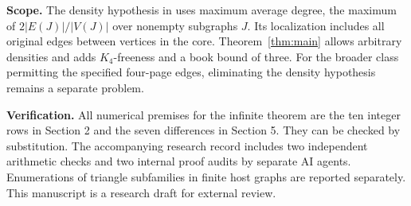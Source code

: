 \documentclass[11pt,a4paper]{article}
\newcommand{\smalltitle}[1]{\par\medskip\noindent\textbf{#1}\enspace}
\begin{document}
\smalltitle{Scope.}
The density hypothesis in \cite{tsu} uses maximum average degree, the
maximum of \(2|E(J)|/|V(J)|\) over nonempty subgraphs \(J\). Its localization
includes all original edges between vertices in the core. Theorem~\ref{thm:main}
allows arbitrary densities and adds \(K_4\)-freeness and a book bound of three.
For the broader class permitting the specified four-page edges, eliminating
the density hypothesis remains a separate problem.

\smalltitle{Verification.}
All numerical premises for the infinite theorem are the ten integer rows
in Section 2 and the seven differences in Section 5. They can be checked by
substitution. The accompanying research record includes two independent
arithmetic checks and two internal proof audits by separate AI agents.
Enumerations of triangle subfamilies in finite host graphs are reported
separately. This manuscript is a research draft for external review.
\end{document}
